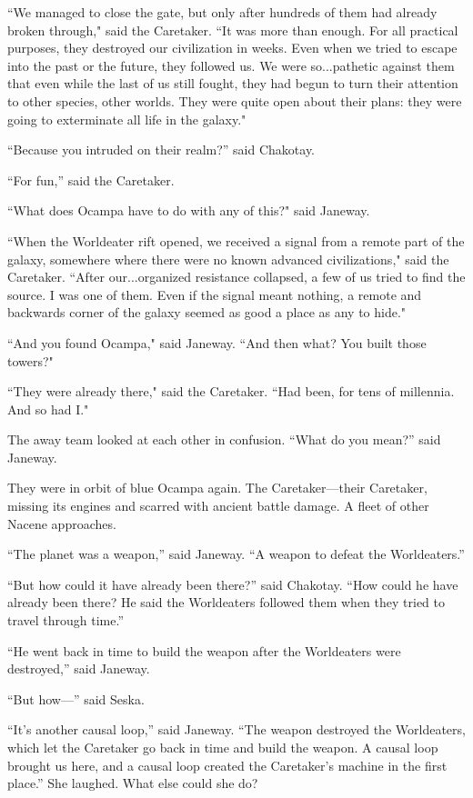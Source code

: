 \documentclass[twoside,letterpaper,12pt]{memoir}
\begin{document}
``We managed to close the gate, but only after hundreds of them had already broken through," said the Caretaker. ``It was more than enough. For all practical purposes, they destroyed our civilization in weeks. Even when we tried to escape into the past or the future, they followed us. We were so...pathetic against them that even while the last of us still fought, they had begun to turn their attention to other species, other worlds. They were quite open about their plans: they were going to exterminate all life in the galaxy." 

``Because you intruded on their realm?” said Chakotay. 

``For fun,” said the Caretaker. 

``What does Ocampa have to do with any of this?" said Janeway. 

``When the Worldeater rift opened, we received a signal from a remote part of the galaxy, somewhere where there were no known advanced civilizations," said the Caretaker. ``After our...organized resistance collapsed, a few of us tried to find the source. I was one of them. Even if the signal meant nothing, a remote and backwards corner of the galaxy seemed as good a place as any to hide." 

``And you found Ocampa," said Janeway. ``And then what? You built those towers?" 

``They were already there," said the Caretaker. ``Had been, for tens of millennia. And so had I." 

The away team looked at each other in confusion. ``What do you mean?” said Janeway. 

They were in orbit of blue Ocampa again. The Caretaker—their Caretaker, missing its engines and scarred with ancient battle damage. A fleet of other Nacene approaches. 

``The planet was a weapon,” said Janeway. ``A weapon to defeat the Worldeaters.” 

``But how could it have already been there?” said Chakotay. ``How could he have already been there? He said the Worldeaters followed them when they tried to travel through time.” 

``He went back in time to build the weapon after the Worldeaters were destroyed,” said Janeway. 

``But how—” said Seska. 

``It’s another causal loop,” said Janeway. ``The weapon destroyed the Worldeaters, which let the Caretaker go back in time and build the weapon. A causal loop brought us here, and a causal loop created the Caretaker’s machine in the first place.” She laughed. What else could she do? 
\end{document}
